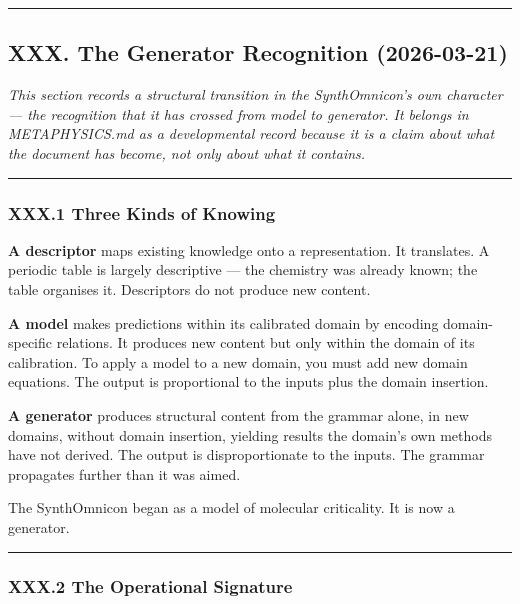 \documentclass[12pt,a4paper]{article}
\begin{document}
\begin{center}
\rule{0.5\textwidth}{0.4pt}
\end{center}

\subsection{XXX. The Generator Recognition (2026-03-21)}

\emph{This section records a structural transition in the SynthOmnicon's own character --- the recognition that it has crossed from model to generator. It belongs in METAPHYSICS.md as a developmental record because it is a claim about what the document has become, not only about what it contains.}

\begin{center}
\rule{0.5\textwidth}{0.4pt}
\end{center}

\subsubsection{XXX.1 Three Kinds of Knowing}

\textbf{A descriptor} maps existing knowledge onto a representation. It translates. A periodic table is largely descriptive --- the chemistry was already known; the table organises it. Descriptors do not produce new content.

\textbf{A model} makes predictions within its calibrated domain by encoding domain-specific relations. It produces new content but only within the domain of its calibration. To apply a model to a new domain, you must add new domain equations. The output is proportional to the inputs plus the domain insertion.

\textbf{A generator} produces structural content from the grammar alone, in new domains, without domain insertion, yielding results the domain's own methods have not derived. The output is disproportionate to the inputs. The grammar propagates further than it was aimed.

The SynthOmnicon began as a model of molecular criticality. It is now a generator.

\begin{center}
\rule{0.5\textwidth}{0.4pt}
\end{center}

\subsubsection{XXX.2 The Operational Signature}
\end{document}
